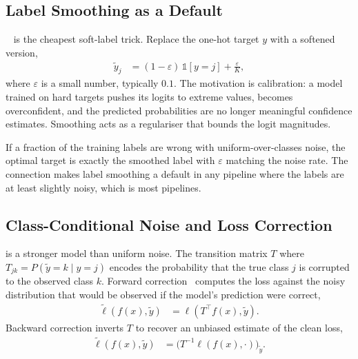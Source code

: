 \subsection{Label Smoothing as a Default}

~\cite{Szegedy2016LabelSmoothing} is the cheapest soft-label trick. Replace the one-hot target $y$ with a softened version,
\begin{align*}
    \tilde y_j &= (1 - \varepsilon) \, \mathbb{1}[y = j] + \tfrac{\varepsilon}{K},
\end{align*}
where $\varepsilon$ is a small number, typically $0.1$. The motivation is calibration: a model trained on hard targets pushes its logits to extreme values, becomes overconfident, and the predicted probabilities are no longer meaningful confidence estimates. Smoothing acts as a regulariser that bounds the logit magnitudes.

 If a fraction of the training labels are wrong with uniform-over-classes noise, the optimal target is exactly the smoothed label with $\varepsilon$ matching the noise rate. The connection makes label smoothing a default in any pipeline where the labels are at least slightly noisy, which is most pipelines.

\subsection{Class-Conditional Noise and Loss Correction}

 is a stronger model than uniform noise. The transition matrix $T$ where $T_{jk} = P(\tilde y = k \mid y = j)$ encodes the probability that the true class $j$ is corrupted to the observed class $k$. Forward correction~\cite{Patrini2017LossCorrection} computes the loss against the noisy distribution that would be observed if the model's prediction were correct,
\begin{align*}
    \tilde \ell(f(x), \tilde y) &= \ell(T^\top f(x), \tilde y).
\end{align*}
Backward correction inverts $T$ to recover an unbiased estimate of the clean loss,
\begin{align*}
    \tilde \ell(f(x), \tilde y) &= \bigl(T^{-1} \ell(f(x), \cdot)\bigr)_{\tilde y}.
\end{align*}


